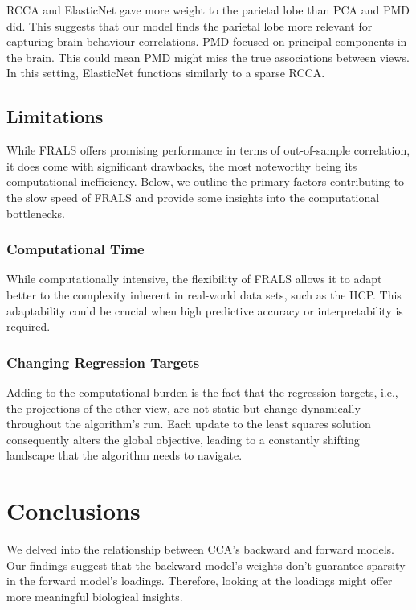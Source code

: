 RCCA and ElasticNet gave more weight to the parietal lobe than PCA and PMD did.
This suggests that our model finds the parietal lobe more relevant for capturing brain-behaviour correlations.
PMD focused on principal components in the brain.
This could mean PMD might miss the true associations between views.
In this setting, ElasticNet functions similarly to a sparse RCCA.

\subsection{Limitations}
While FRALS offers promising performance in terms of out-of-sample correlation, it does come with significant drawbacks, the most noteworthy being its computational inefficiency.
Below, we outline the primary factors contributing to the slow speed of FRALS and provide some insights into the computational bottlenecks.

\subsubsection{Computational Time}\label{subsec:computational-time}
While computationally intensive, the flexibility of FRALS allows it to adapt better to the complexity inherent in real-world data sets, such as the HCP. This adaptability could be crucial when high predictive accuracy or interpretability is required.

\subsubsection{Changing Regression Targets}\label{subsec:changing-regression-targets}
Adding to the computational burden is the fact that the regression targets, i.e., the projections of the other view, are not static but change dynamically throughout the algorithm's run.
Each update to the least squares solution consequently alters the global objective, leading to a constantly shifting landscape that the algorithm needs to navigate.

\section{Conclusions}

We delved into the relationship between CCA's backward and forward models.
Our findings suggest that the backward model's weights don't guarantee sparsity in the forward model's loadings.
Therefore, looking at the loadings might offer more meaningful biological insights.

